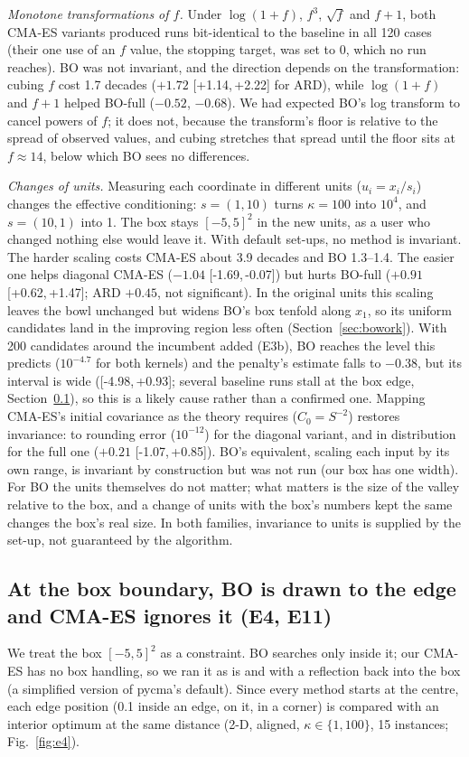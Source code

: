 \documentclass[10pt,a4paper]{article}
\newcommand{\ci}[2]{[#1,\,#2]}
\begin{document}
\emph{Monotone transformations of $f$.} Under $\log(1+f)$, $f^3$, $\sqrt f$ and $f+1$, both CMA-ES variants
produced runs bit-identical to the baseline in all 120 cases (their one use of an $f$ value, the stopping
target, was set to 0, which no run reaches). BO was not invariant, and the direction depends
on the transformation: cubing $f$ cost 1.7 decades ($+1.72$ \ci{+1.14}{+2.22} for ARD), while $\log(1+f)$
and $f+1$ helped BO-full ($-0.52$, $-0.68$). We had expected BO's log transform to cancel powers of $f$; it
does not, because the transform's floor is relative to the spread of observed values, and cubing stretches
that spread until the floor sits at $f\approx14$, below which BO sees no differences.

\emph{Changes of units.} Measuring each coordinate in different units ($u_i=x_i/s_i$) changes the effective
conditioning: $s=(1,10)$ turns $\kappa=100$ into $10^4$, and $s=(10,1)$ into 1. The box stays $[-5,5]^2$ in the
new units, as a user who changed nothing else would leave it. With default set-ups, no method
is invariant. The harder scaling costs CMA-ES about 3.9 decades and BO 1.3--1.4. The easier one helps
diagonal CMA-ES ($-1.04$ \ci{-1.69}{-0.07}) but hurts BO-full ($+0.91$ \ci{+0.62}{+1.47}; ARD $+0.45$, not significant).
In the original units this scaling leaves the bowl unchanged but widens BO's box tenfold along $x_1$, so its
uniform candidates land in the improving region less often (Section~\ref{sec:bowork}). With 200 candidates around the incumbent
added (E3b), BO reaches the level this predicts ($10^{-4.7}$ for both kernels) and the penalty's estimate falls to
$-0.38$, but its interval is wide (\ci{-4.98}{+0.93}; several baseline runs stall at the box edge,
Section~\ref{sec:boundary}), so this is a likely cause rather than a confirmed one. Mapping CMA-ES's initial covariance as the theory requires ($C_0=S^{-2}$)
restores invariance: to rounding error ($10^{-12}$) for the diagonal variant, and in distribution for the full one ($+0.21$
\ci{-1.07}{+0.85}). BO's equivalent, scaling each input by its own range, is invariant by construction but was not run (our box
has one width). For BO the units themselves do not matter; what matters is the size of the valley relative to the box, and a
change of units with the box's numbers kept the same changes the box's real size. In both families, invariance
to units is supplied by the set-up, not guaranteed by the algorithm.

\subsection{At the box boundary, BO is drawn to the edge and CMA-ES ignores it (E4, E11)}\label{sec:boundary}
We treat the box $[-5,5]^2$ as a constraint. BO searches only inside it; our CMA-ES has no box handling, so we
ran it as is and with a reflection back into the box (a simplified version of pycma's default). Since every
method starts at the centre, each edge position (0.1 inside an edge, on it, in a corner) is compared with an
interior optimum at the same distance (2-D, aligned, $\kappa\in\{1,100\}$, 15 instances; Fig.~\ref{fig:e4}).
\end{document}
